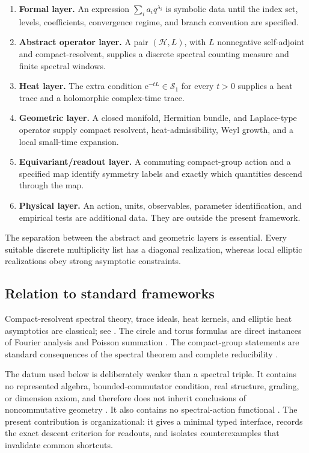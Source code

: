 \documentclass[11pt,a4paper]{article}
\theoremstyle{definition}
\theoremstyle{remark}
\newcommand{\Hcal}{\mathcal H}
\newcommand{\Scal}{\mathcal S}
\newcommand{\e}{\mathrm e}
\begin{document}
\begin{enumerate}
\item \textbf{Formal layer.} An expression
      \(\sum_i a_iq^{\lambda_i}\) is symbolic data until the index set,
      levels, coefficients, convergence regime, and branch convention are
      specified.
\item \textbf{Abstract operator layer.} A pair \((\Hcal,L)\), with \(L\)
      nonnegative self-adjoint and compact-resolvent, supplies a discrete
      spectral counting measure and finite spectral windows.
\item \textbf{Heat layer.} The extra condition
      \(\e^{-tL}\in\Scal_1\) for every \(t>0\) supplies a heat trace and a
      holomorphic complex-time trace.
\item \textbf{Geometric layer.} A closed manifold, Hermitian bundle, and
      Laplace-type operator supply compact resolvent, heat-admissibility, Weyl
      growth, and a local small-time expansion.
\item \textbf{Equivariant/readout layer.} A commuting compact-group action and a
      specified map identify symmetry labels and exactly which quantities
      descend through the map.
\item \textbf{Physical layer.} An action, units, observables, parameter
      identification, and empirical tests are additional data. They are outside
      the present framework.
\end{enumerate}

The separation between the abstract and geometric layers is essential. Every
suitable discrete multiplicity list has a diagonal realization, whereas local
elliptic realizations obey strong asymptotic constraints.

\subsection{Relation to standard frameworks}

Compact-resolvent spectral theory, trace ideals, heat kernels, and elliptic heat
asymptotics are classical; see
\cite{ReedSimonIV,Kato,SimonTrace,Davies,MinakPleijel,Gilkey1975,Seeley1967}.
The circle and torus formulas are direct instances of Fourier analysis and
Poisson summation \cite{SteinShakarchi,MumfordTheta}. The compact-group statements
are standard consequences of the spectral theorem and complete reducibility
\cite{Folland,FultonHarris}.

The datum used below is deliberately weaker than a spectral triple. It contains
no represented algebra, bounded-commutator condition, real structure, grading,
or dimension axiom, and therefore does not inherit conclusions of
noncommutative geometry \cite{Connes1994}. It also contains no spectral-action
functional \cite{ChamseddineConnes1997}. The present contribution is
organizational: it gives a minimal typed interface, records the exact descent
criterion for readouts, and isolates counterexamples that invalidate common
shortcuts.
\end{document}
